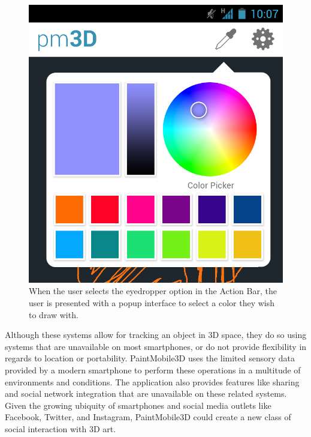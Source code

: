 \documentclass{chi-ext}
\begin{document}
\begin{figure}
\hspace{\columnwidth}%
\parbox{\columnwidth}{
  \centering
  \includegraphics[width=\columnwidth]{colorpicker.jpg}
  \caption{When the user selects the eyedropper option in the Action Bar, the user is presented with a popup interface to select a color they wish to draw with.}
  \label{fig:colorpicker}
}
\end{figure}

Although these systems allow for tracking an object in 3D space, they do so using systems that are unavailable on most smartphones, or do not provide flexibility in regards to location or portability. PaintMobile3D uses the limited sensory data provided by a modern smartphone to perform these operations in a multitude of environments and conditions. The application also provides features like sharing and social network integration that are unavailable on these related systems. Given the growing ubiquity of smartphones and social media outlets like Facebook, Twitter, and Instagram, PaintMobile3D could create a new class of social interaction with 3D art. \cite{brooks1997determining} \cite{schkolne2002drawing} \cite{voigt2011robust} \cite{hol2007robust}
\end{document}
